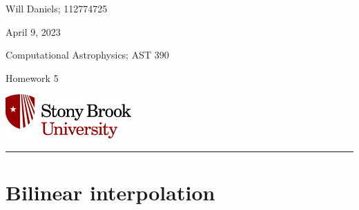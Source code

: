 \documentclass[12pt, letterpaper]{article}
\begin{document}
\noindent
\begin{minipage}{0.5\textwidth}
    Will Daniels; 112774725

    April 9, 2023

    Computational Astrophysics; AST 390

    Homework 5
\end{minipage}
%
\begin{minipage}{0.5\textwidth}
    \begin{flushright}
        \includegraphics[height = 48pt]{../../LatexAssets/SBULogoStacked}
    \end{flushright}
\end{minipage}
\noindent
\rule{\textwidth}{1pt}

\section{Bilinear interpolation}
\end{document}
